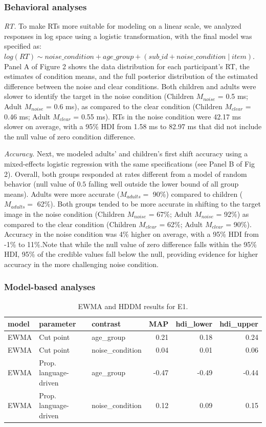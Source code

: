 \documentclass[10pt, letterpaper]{article}
\begin{document}
\subsubsection{Behavioral analyses}\label{behavioral-analyses}

\emph{RT.} To make RTs more suitable for modeling on a linear scale, we
analyzed responses in log space using a logistic transformation, with
the final model was specified as:
\texttt{$log(RT) \sim noise\_condition + age\_group + (sub\_id + noise\_condition \mid item)$}.
Panel A of Figure 2 shows the data distribution for each participant's
RT, the estimates of condition means, and the full posterior
distribution of the estimated difference between the noise and clear
conditions. Both children and adults were slower to identify the target
in the noise condition (Children \(M_{noise}\) = 0.5 ms; Adult
\(M_{noise}\) = 0.6 ms), as compared to the clear condition (Children
\(M_{clear}\) = 0.46 ms; Adult \(M_{clear}\) = 0.55 ms). RTs in the
noise condition were 42.17 ms slower on average, with a 95\% HDI from
1.58 ms to 82.97 ms that did not include the null value of zero
condition difference.

\emph{Accuracy.} Next, we modeled adults' and children's first shift
accuracy using a mixed-effects logistic regression with the same
specifications (see Panel B of Fig 2). Overall, both groups responded at
rates different from a model of random behavior (null value of \(0.5\)
falling well outside the lower bound of all group means). Adults were
more accurate (\(M_{adults} =\) 90\%) compared to children
(\(M_{adults} =\) 62\%). Both groups tended to be more accurate in
shifting to the target image in the noise condition (Children
\(M_{noise}\) = 67\%; Adult \(M_{noise}\) = 92\%) as compared to the
clear condition (Children \(M_{clear}\) = 62\%; Adult \(M_{clear}\) =
90\%). Accuracy in the noise condition was 4\% higher on average, with a
95\% HDI from -1\% to 11\%.Note that while the null value of zero
difference falls within the 95\% HDI, 95\% of the credible values fall
below the null, providing evidence for higher accuracy in the more
challenging noise condition.

\subsubsection{Model-based analyses}\label{model-based-analyses}

\begin{table}[b]
\centering
\begin{tabular}{lllrrr}
  \hline
model & parameter & contrast & MAP & hdi\_lower & hdi\_upper \\ 
  \hline
EWMA & Cut point & age\_group & 0.21 & 0.18 & 0.24 \\ 
  EWMA & Cut point & noise\_condition & 0.04 & 0.01 & 0.06 \\ 
  EWMA & Prop. language-driven & age\_group & -0.47 & -0.49 & -0.44 \\ 
  EWMA & Prop. language-driven & noise\_condition & 0.12 & 0.09 & 0.15 \\ 
   \hline
\end{tabular}
\caption{EWMA and HDDM results for E1.} 
\end{table}
\end{document}
